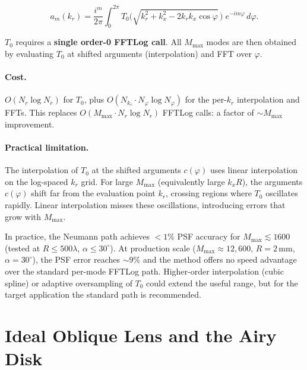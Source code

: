 \documentclass[11pt,a4paper]{article}
\begin{document}
\begin{tcolorbox}[title=Neumann shift theorem (final)]
\begin{equation}\label{eq:neumann_shift}
  a_m(k_r) = \frac{i^m}{2\pi}\int_0^{2\pi}
    T_0\!\bigl(\sqrt{k_r^2+k_x^2-2k_r k_x\cos\varphi}\,\bigr)\;
    e^{-im\varphi}\,d\varphi.
\end{equation}
\end{tcolorbox}

\noindent
$T_0$ requires a \textbf{single order-0 FFTLog call}.  All $M_{\max}$ modes are
then obtained by evaluating $T_0$ at shifted arguments (interpolation) and
FFT over $\varphi$.

\paragraph{Cost.}
$O(N_r\log N_r)$ for $T_0$, plus $O(N_{k_r}\cdot N_\varphi\log N_\varphi)$ for
the per-$k_r$ interpolation and FFTs.  This replaces $O(M_{\max}\cdot N_r\log N_r)$
FFTLog calls: a factor of $\sim M_{\max}$ improvement.

\paragraph{Practical limitation.}
The interpolation of $T_0$ at the shifted arguments $c(\varphi)$ uses linear
interpolation on the log-spaced $k_r$ grid.  For large $M_{\max}$ (equivalently
large $k_x R$), the arguments $c(\varphi)$ shift far from the evaluation point $k_r$,
crossing regions where $T_0$ oscillates rapidly.  Linear interpolation misses these
oscillations, introducing errors that grow with $M_{\max}$.

In practice, the Neumann path achieves ${<}1\%$ PSF accuracy for
$M_{\max} \lesssim 1600$ (tested at $R \le 500\lambda$, $\alpha \le 30^\circ$).
At production scale ($M_{\max} \approx 12{,}600$, $R = 2\,\text{mm}$,
$\alpha = 30^\circ$), the PSF error reaches ${\sim}9\%$ and the method offers
no speed advantage over the standard per-mode FFTLog path.
Higher-order interpolation (cubic spline) or adaptive oversampling of $T_0$
could extend the useful range, but for the target application the standard
path is recommended.


\section{Ideal Oblique Lens and the Airy Disk}
\label{sec:airy}
\end{document}
